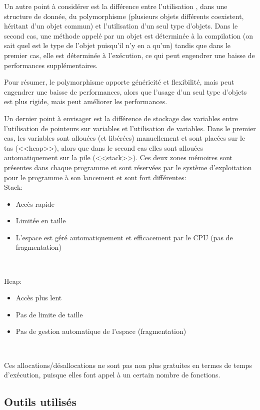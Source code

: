 \documentclass[a4paper,french,12pt]{article}
\begin{document}
	      Un autre point à considérer est la différence entre l'utilisation , dans une structure de donnée, du polymorphisme (plusieurs objets
	      différents coexistent, héritant d'un objet commun) et l'utilisation d'un seul type d'objets.
	      Dans le second cas, une méthode appelé par un objet est déterminée à la compilation (on sait quel est le type
	      de l'objet puisqu'il n'y en a qu'un) tandis que dans le premier cas, elle est déterminée à l'exécution,
	      ce qui peut engendrer une baisse de performances supplémentaires.

	      Pour résumer, le polymorphisme apporte généricité et flexibilité, mais peut engendrer une baisse de
	      performances, alors que l'usage d'un seul type d'objets est plus rigide, mais peut améliorer les performances.

	      Un dernier point à envisager est la différence de stockage des variables entre l'utilisation de pointeurs sur variables
	      et l'utilisation de variables. Dans le premier cas, les variables sont allouées (et libérées) manuellement et sont placées sur
	      le tas (<<heap>>), alors que dans le second cas elles sont allouées automatiquement sur la pile (<<stack>>).
	      Ces deux zones mémoires sont présentes dans chaque programme et sont réservées par le système d'exploitation
	      pour le programme à son lancement et sont fort différentes:\\

	      Stack:
	      \begin{itemize}
		\item Accès rapide
		\item Limitée en taille
		\item L'espace est géré automatiquement et efficacement par le CPU (pas de fragmentation)
	      \end{itemize}~

	      Heap:
	      \begin{itemize}
		\item Accès plus lent
		\item Pas de limite de taille
		\item Pas de gestion automatique de l'espace (fragmentation)
	      \end{itemize}~

	      Ces allocations/désallocations ne sont pas non plus gratuites en termes de temps d'exécution, puisque
	      elles font appel à un certain nombre de fonctions.


	\subsection{Outils utilisés}
\end{document}
